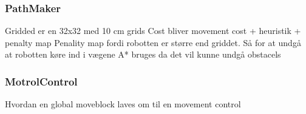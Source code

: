 \documentclass[Main]{subfiles}
\begin{document}
	\subsubsection{PathMaker} %
	\label{subsub:software_pathmaker}
	Gridded er en 32x32 med 10 cm grids
	Cost bliver movement cost + heuristik + penalty map
	Penality map fordi robotten er større end griddet.
	Så for at undgå at robotten køre ind i vægene
	A* bruges da det vil kunne undgå obstacels
	
	\subsubsection{MotrolControl} %
	\label{subsub:software_motorcontrol}
	Hvordan en global moveblock laves om til en movement control
	
\end{document}
